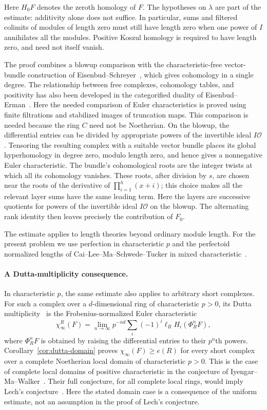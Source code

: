 \documentclass[11pt]{article}
\numberwithin{equation}{section}
\theoremstyle{definition}
\DeclareMathOperator{\length}{\ell}
\newcommand{\cO}{\mathcal O}
\begin{document}
Here $H_0F$ denotes the zeroth homology of $F$. The hypotheses on
$\lambda$ are part of the estimate: additivity alone does not suffice.
In particular, sums and filtered colimits of modules of length zero
must still have length zero when one power of $I$ annihilates all
the modules. Positive Koszul homology is required to have length
zero, and need not itself vanish.

The proof combines a blowup comparison with the characteristic-free
vector-bundle construction of Eisenbud--Schreyer~\cite{EisenbudSchreyer},
which gives cohomology in a single degree. The relationship between
free complexes, cohomology tables, and positivity has also been
developed in the categorified duality of
Eisenbud--Erman~\cite{EisenbudErman}. Here the needed comparison of Euler
characteristics is proved using finite filtrations and stabilized images
of truncation maps. This comparison is needed because the ring $C$
need not be Noetherian. On the blowup, the differential entries can
be divided by appropriate powers of the invertible ideal $I\cO$.
Tensoring the resulting complex with a suitable vector bundle places
its global hyperhomology in degree zero, modulo length zero, and
hence gives a nonnegative Euler characteristic. The bundle's
cohomological roots are the integer twists at which all its
cohomology vanishes. These roots, after division by $s$, are chosen
near the roots of the derivative
of $\prod_{i=1}^h(x+i)$; this choice makes all
the relevant layer sums have the same leading term. Here the layers
are successive quotients for powers of the invertible ideal
$I\cO$ on the blowup. The alternating
rank identity then leaves precisely the contribution of $F_0$.

The estimate applies to length theories beyond ordinary module length.
For the present problem we use perfection in characteristic $p$ and the
perfectoid normalized lengths of Cai--Lee--Ma--Schwede--Tucker in mixed
characteristic~\cite{CLMST}.

\paragraph{A Dutta-multiplicity consequence.}
In characteristic $p$, the same estimate also applies to arbitrary
short complexes. For such a complex over a $d$-dimensional ring of
characteristic $p>0$, its Dutta multiplicity~\cite{Dutta} is the
Frobenius-normalized Euler
characteristic
\[
 \chi_\infty^R(F)=\lim_{n\to\infty}p^{-nd}
       \sum_i(-1)^i\length_R H_i(\Phi_R^nF),
\]
where $\Phi_R^nF$ is obtained by raising the differential entries to
their $p^n$th powers.
Corollary~\ref{cor:dutta-domain} proves
$\chi_\infty(F)\geq e(R)$ for every short complex over a complete
Noetherian local domain of characteristic $p>0$.  This is the case of
complete local domains of positive characteristic in the conjecture of
Iyengar--Ma--Walker~\cite[Conjecture~8.1]{IMW2022}.
Their full conjecture, for all complete local rings, would imply
Lech's conjecture~\cite[Proposition~8.3]{IMW2022}. Here the stated
domain case is a consequence of the uniform estimate, not an
assumption in the proof of Lech's conjecture.
\end{document}
